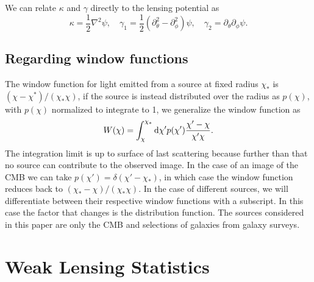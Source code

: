 \documentclass[11pt]{article} %
\DeclareRobustCommand{\d}{\ifmmode\text{d}\else d\fi}
\begin{document}
We can relate $\kappa$ and $\gamma$ directly to the lensing potential as
\begin{equation}
    \kappa = \frac{1}{2}\nabla^2\psi, \quad \gamma_1 = \frac{1}{2}(\partial_\theta^2 - \partial_\phi^2)\psi, \quad \gamma_2 = \partial_\theta\partial_\phi \psi.
\end{equation}

\subsection{Regarding window functions}
The window function for light emitted from a source at fixed radius $\chi_*$ is $(\chi-\chi^*)/(\chi_*\chi)$, if the source is instead distributed over the radius as $p(\chi)$, with $p(\chi)$ normalized to integrate to 1, we generalize the window function as
\begin{equation*}
    W(\chi) = \int_\chi^{\chi_*}\d\chi' p(\chi')\frac{\chi'-\chi}{\chi'\chi}.
\end{equation*}
The integration limit is up to surface of last scattering because further than that no source can contribute to the observed image. In the case of an image of the CMB we can take $p(\chi')=\delta(\chi'-\chi_*)$, in which case the window function reduces back to $(\chi_*-\chi)/(\chi_*\chi)$. In the case of different sources, we will differentiate between their respective window functions with a subscript. In this case the factor that changes is the distribution function. The sources considered in this paper are only the CMB and selections of galaxies from galaxy surveys. 

\section{Weak Lensing Statistics}\label{sec:weaklensstats}
\end{document}
